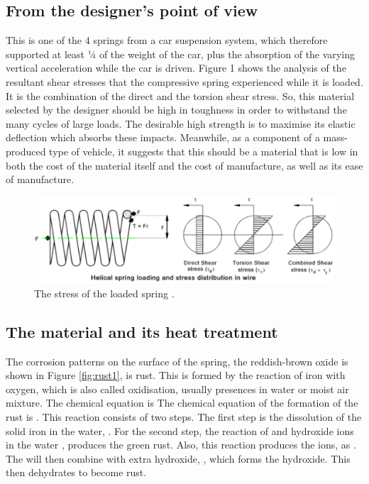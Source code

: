 \documentclass[11pt]{article}
\begin{document}
\subsection{From the designer's point of view}
This is one of the 4 springs from a car suspension system, which therefore supported at least ¼ of the weight of the car, plus the absorption of the varying vertical acceleration while the car is driven. Figure 1 shows the analysis of the resultant shear stresses that the compressive spring experienced while it is loaded. It is the combination of the direct and the torsion shear stress. So, this material selected by the designer should be high in toughness in order to withstand the many cycles of large loads. The desirable high strength is to maximise its elastic deflection which absorbs these impacts. Meanwhile, as a component of a mass-produced type of vehicle, it suggests that this should be a material that is low in both the cost of the material itself and the cost of manufacture, as well as its ease of manufacture.
\begin{figure}[H]
    \centering
    \includegraphics[width = \textwidth]{./img/helical1.png}
    \caption{The stress of the loaded spring \cite{b11}.}
    \label{fig:helical1}
\end{figure}
\subsection{The material and its heat treatment}
The corrosion patterns on the surface of the spring, the reddish-brown oxide is shown in Figure \ref{fig:rust1}, is rust. This is formed by the reaction of iron with oxygen, which is also called oxidisation, usually presences in water or moist air mixture. The chemical equation is The chemical equation of the formation of the rust is . This reaction consists of two steps. The first step is the dissolution of the solid iron in the water, . For the second step, the reaction of  and hydroxide  ions in the water , produces the green rust. Also, this reaction produces the  ions, as . The  will then combine with extra hydroxide, , which forms the  hydroxide. This then dehydrates to become rust. 
 
\end{document}
